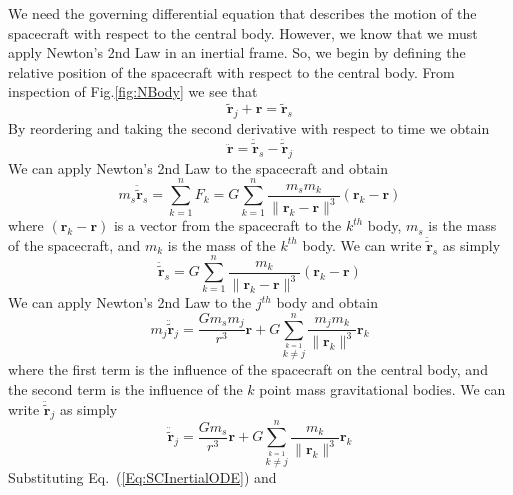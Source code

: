 We need the governing differential equation that describes the
motion of the spacecraft with respect to the central body.  However,
we know that we must apply Newton's 2nd Law in an inertial frame.
So, we begin by defining the relative position of the spacecraft
with respect to the central body.  From inspection of
Fig.\ref{fig:NBody} we see that
%
\begin{equation}
     \tilde{\mathbf{r}}_j +  \mathbf{r} = \tilde{\mathbf{r}}_s
\end{equation}
%
By reordering and taking the second derivative with respect to time
we obtain
%
\begin{equation}
     \ddot{\mathbf{r}} = \ddot{\tilde{\mathbf{r}}}_s - \ddot{\tilde{\mathbf{r}}}_j
     \label{Eq:SCRelativeODE}
\end{equation}
%
We can apply Newton's 2nd Law to the spacecraft and obtain
%
\begin{equation}
     m_s \ddot{\tilde{\mathbf{r}}}_s = \sum_{k=1}^n F_k =
     G\sum_{k=1}^n \frac{m_s m_k}{\| \mathbf{r}_{k} - \mathbf{r}\|^3} \left(\mathbf{r}_{k} -
     \mathbf{r}\right)
\end{equation}
%
where $\left(\mathbf{r}_{k} - \mathbf{r}\right)$ is a vector from
the spacecraft to the $k^{th}$ body, $m_s$ is the mass of the
spacecraft, and $m_k$ is the mass of the $k^{th}$ body.  We can
write $\ddot{\tilde{\mathbf{r}}}_s$ as simply
%
\begin{equation}
    \ddot{\tilde{\mathbf{r}}}_s =
     G\sum_{k=1}^n \frac{m_k}{\| \mathbf{r}_{k} - \mathbf{r}\|^3} \left(\mathbf{r}_{k} -
     \mathbf{r}\right) \label{Eq:SCInertialODE}
\end{equation}
%
We can apply Newton's 2nd Law to the $j^{th}$ body and obtain
%
\begin{equation}
     m_j \ddot{\tilde{\mathbf{r}}}_j = \frac{G m_s
     m_j}{r^3}\mathbf{r} +
     G\sum_{\stackrel{k=1}{k \neq j}}^{n} \frac{m_j m_k}{\| \mathbf{r}_{k}\|^3}\mathbf{r}_{k}
\end{equation}
%
where the first term is the influence of the spacecraft on the
central body, and the second term is the influence of the $k$ point
mass gravitational bodies.  We can write
$\ddot{\tilde{\mathbf{r}}}_j$ as simply
%
\begin{equation}
     \ddot{\tilde{\mathbf{r}}}_j = \frac{G m_s
     }{r^3}\mathbf{r} +
     G\sum_{\stackrel{k=1}{k \neq j}}^{n} \frac{ m_k}{\|
     \mathbf{r}_{k}\|^3}\mathbf{r}_{k} \label{Eq:CentalBodyInertialODE}
\end{equation}
%
Substituting Eq.~(\ref{Eq:SCInertialODE}) and
